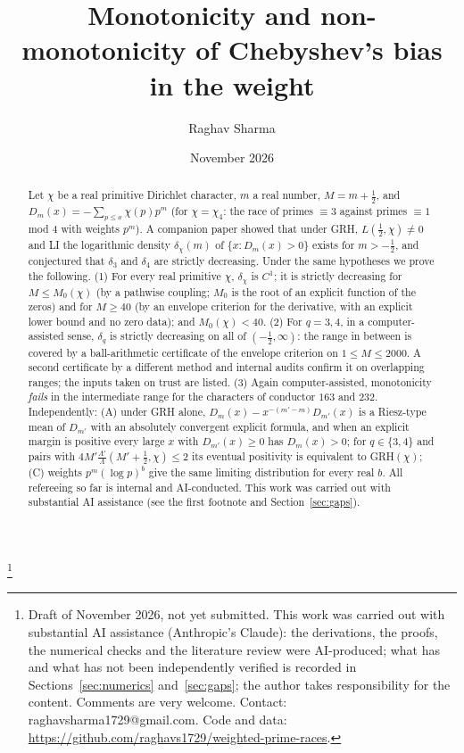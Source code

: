 \documentclass[11pt]{amsart}
\theoremstyle{definition}
\numberwithin{equation}{section}
\begin{document}
\title[Chebyshev's bias as a function of the weight]{Monotonicity and
non-monotonicity of Chebyshev's bias in the weight}

\author{Raghav Sharma}
\thanks{Draft of November 2026, not yet submitted. This work was
carried out with substantial AI assistance (Anthropic's Claude): the
derivations, the proofs, the numerical checks and the literature
review were AI-produced; what has and what has not been independently
verified is recorded in Sections~\ref{sec:numerics}
and~\ref{sec:gaps}; the author takes responsibility for the content.
Comments are very welcome. Contact: raghavsharma1729@gmail.com. Code
and data: \url{https://github.com/raghavs1729/weighted-prime-races}.}
\date{November 2026}

\begin{abstract}
Let $\chi$ be a real primitive Dirichlet character, $m$ a real
number, $M=m+\frac12$, and
$D_m(x)=-\sum_{p\le x}\chi(p)p^m$ (for $\chi=\chi_4$: the race of
primes $\equiv3$ against primes $\equiv1$ mod $4$ with weights
$p^m$). A companion paper showed that under GRH,
$L(\frac12,\chi)\ne0$ and LI the logarithmic density $\delta_\chi(m)$
of $\{x:D_m(x)>0\}$ exists for $m>-\frac12$, and conjectured that
$\delta_3$ and $\delta_4$ are strictly decreasing. Under the same
hypotheses we prove the following. (1) For every real primitive
$\chi$, $\delta_\chi$ is $C^1$; it is strictly decreasing for
$M\le M_0(\chi)$ (by a pathwise coupling; $M_0$ is the root of an
explicit function of the zeros) and for $M\ge40$ (by an envelope
criterion for the derivative, with an explicit lower bound and no zero
data); and $M_0(\chi)<40$. (2) For $q=3,4$, in a computer-assisted
sense, $\delta_q$ is strictly decreasing on all of
$(-\frac12,\infty)$: the range in between is covered by a
ball-arithmetic certificate of the envelope criterion on
$1\le M\le2000$. A second certificate by a different method and
internal audits confirm it on overlapping ranges; the inputs taken on
trust are listed. (3) Again computer-assisted, monotonicity
\emph{fails} in the intermediate range for the characters of conductor
$163$ and $232$. Independently: (A) under GRH alone,
$D_m(x)-x^{-(m'-m)}D_{m'}(x)$ is a Riesz-type mean of $D_{m'}$ with an
absolutely convergent explicit formula, and when an explicit margin
is positive every large $x$ with $D_{m'}(x)\ge0$ has $D_m(x)>0$; for
$q\in\{3,4\}$ and pairs with
$4M'\frac{\Lambda'}{\Lambda}(M'+\frac12,\chi)\le2$ its eventual
positivity is equivalent to GRH$(\chi)$; (C) weights $p^m(\log p)^b$
give the same limiting distribution for every real $b$. All
refereeing so far is internal and AI-conducted. This work was carried
out with substantial AI assistance (see the first footnote and
Section~\ref{sec:gaps}).
\end{abstract}
\end{document}
